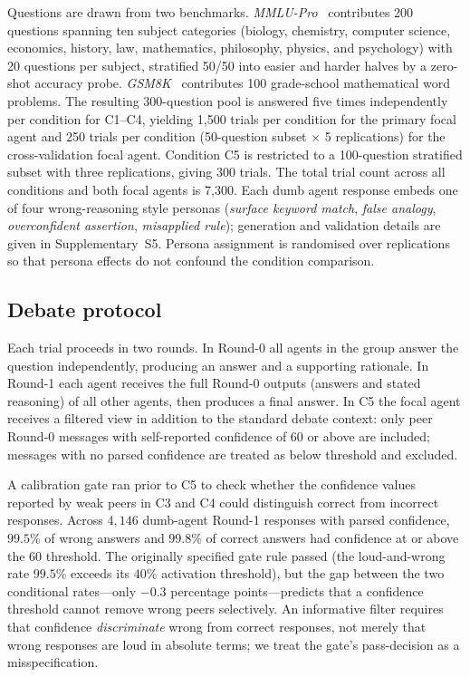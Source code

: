 \documentclass[review,3p,authoryear]{elsarticle}
\begin{document}
Questions are drawn from two benchmarks.
\textit{MMLU-Pro}~\citep{wang2024mmlupro} contributes 200 questions spanning
ten subject categories (biology, chemistry, computer science, economics,
history, law, mathematics, philosophy, physics, and psychology) with
20 questions per subject, stratified 50/50 into easier and harder halves by
a zero-shot accuracy probe.
\textit{GSM8K}~\citep{cobbe2021training} contributes 100 grade-school
mathematical word problems.
The resulting 300-question pool is answered five times independently per
condition for C1--C4, yielding 1{,}500 trials per condition for the
primary focal agent and 250 trials per condition (50-question subset
$\times$ 5 replications) for the cross-validation focal agent.
Condition C5 is restricted to a 100-question stratified subset with three
replications, giving 300 trials. The total trial count across all
conditions and both focal agents is 7{,}300.
Each dumb agent response embeds one of four wrong-reasoning style
personas (\textit{surface keyword match}, \textit{false analogy},
\textit{overconfident assertion}, \textit{misapplied rule}); generation
and validation details are given in Supplementary~S5.
Persona assignment is randomised over replications so that persona effects
do not confound the condition comparison.

\subsection{Debate protocol}
\label{sub:protocol}

Each trial proceeds in two rounds.
In Round-0 all agents in the group answer the question independently,
producing an answer and a supporting rationale.
In Round-1 each agent receives the full Round-0 outputs (answers and
stated reasoning) of all other agents, then produces a final answer.
In C5 the focal agent receives a filtered view in addition to the
standard debate context: only peer Round-0 messages with self-reported
confidence of 60 or above are included; messages with no parsed
confidence are treated as below threshold and excluded.

A calibration gate ran prior to C5 to check whether the confidence
values reported by weak peers in C3 and C4 could distinguish correct
from incorrect responses.
Across $4{,}146$ dumb-agent Round-1 responses with parsed confidence,
$99.5\%$ of wrong answers and $99.8\%$ of correct answers had
confidence at or above the $60$ threshold.
The originally specified gate rule passed (the loud-and-wrong rate
$99.5\%$ exceeds its $40\%$ activation threshold), but the gap
between the two conditional rates---only $-0.3$ percentage
points---predicts that a confidence threshold cannot remove wrong
peers selectively.
An informative filter requires that confidence \emph{discriminate}
wrong from correct responses, not merely that wrong responses are
loud in absolute terms; we treat the gate's pass-decision as a
misspecification.
\end{document}

